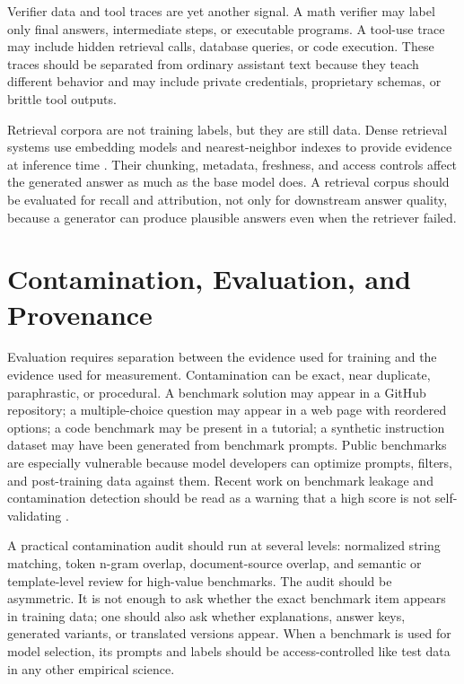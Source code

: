 Verifier data and tool traces are yet another signal. A math verifier may label only final answers, intermediate steps, or executable programs. A tool-use trace may include hidden retrieval calls, database queries, or code execution. These traces should be separated from ordinary assistant text because they teach different behavior and may include private credentials, proprietary schemas, or brittle tool outputs.

Retrieval corpora are not training labels, but they are still data. Dense retrieval systems use embedding models and nearest-neighbor indexes to provide evidence at inference time \cite{karpukhin2020dense,lewis2020retrieval}. Their chunking, metadata, freshness, and access controls affect the generated answer as much as the base model does. A retrieval corpus should be evaluated for recall and attribution, not only for downstream answer quality, because a generator can produce plausible answers even when the retriever failed.

\section{Contamination, Evaluation, and Provenance}
\label{sec:contamination-evaluation-provenance}

Evaluation requires separation between the evidence used for training and the evidence used for measurement. Contamination can be exact, near duplicate, paraphrastic, or procedural. A benchmark solution may appear in a GitHub repository; a multiple-choice question may appear in a web page with reordered options; a code benchmark may be present in a tutorial; a synthetic instruction dataset may have been generated from benchmark prompts. Public benchmarks are especially vulnerable because model developers can optimize prompts, filters, and post-training data against them. Recent work on benchmark leakage and contamination detection should be read as a warning that a high score is not self-validating \cite{shi2023detecting,xu2024benchmark}.

A practical contamination audit should run at several levels: normalized string matching, token n-gram overlap, document-source overlap, and semantic or template-level review for high-value benchmarks. The audit should be asymmetric. It is not enough to ask whether the exact benchmark item appears in training data; one should also ask whether explanations, answer keys, generated variants, or translated versions appear. When a benchmark is used for model selection, its prompts and labels should be access-controlled like test data in any other empirical science.

